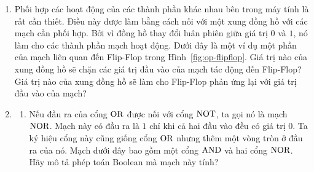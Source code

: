 \begin{enumerate}
 \item Phối hợp các hoạt động của các thành phần khác nhau bên trong
   máy tính là rất cần thiết. Điều này được làm bằng cách nối với một
   xung đồng hồ với các mạch cần phối hợp.  Bởi vì đồng hồ thay đổi
   luân phiên giữa giá trị $0$ và $1$, nó làm cho các thành phần mạch
   hoạt động. Dưới đây là một ví dụ một phần của mạch liên quan đến
   Flip-Flop trong Hình~\ref{fig:op-flipflop}. Giá trị nào của xung
   đồng hồ sẽ chặn các giá trị đầu vào của mạch tác động đến
   Flip-Flop? Giá trị nào của xung đồng hồ sẽ làm cho Flip-Flop phản
   ứng lại với giá trị đầu vào của mạch?
    \begin{center}
    \end{center}

\item
  \begin{enumerate}
  \item Nếu đầu ra của cổng $\operatorname{\mbox{OR}}$ được nối với cổng $\operatorname{\mbox{NOT}}$, ta gọi nó
    là mạch $\operatorname{\mbox{NOR}}$. Mạch này có đầu ra là $1$ chỉ khi cả hai đầu vào
    đều có giá trị $0$. Ta ký hiệu cổng này cũng giống cổng $\operatorname{\mbox{OR}}$
    nhưng thêm một vòng tròn ở đầu ra của nó. Mạch dưới đây bao gồm
    một cổng $\operatorname{\mbox{AND}}$ và hai cổng $\operatorname{\mbox{NOR}}$. Hãy mô tả phép toán Boolean mà
    mạch này tính?
    \begin{center}
    \end{center}


\end{enumerate}
\end{enumerate}
